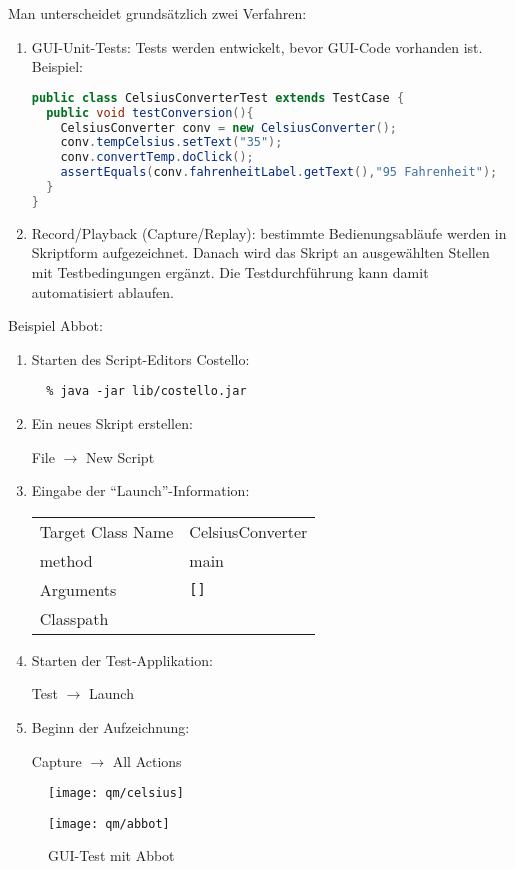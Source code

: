 \newslide
Man unterscheidet grundsätzlich zwei Verfahren:
\begin{enumerate}
\item GUI-Unit-Tests: Tests werden entwickelt, bevor GUI-Code
  vorhanden ist. Beispiel:
\begin{lstlisting}[language=java]
public class CelsiusConverterTest extends TestCase {
  public void testConversion(){
    CelsiusConverter conv = new CelsiusConverter();
    conv.tempCelsius.setText("35");
    conv.convertTemp.doClick();
    assertEquals(conv.fahrenheitLabel.getText(),"95 Fahrenheit");
  }
}
\end{lstlisting}
\newslide
\item Record/Playback (Capture/Replay): bestimmte Bedienungsabläufe werden
in Skriptform aufgezeichnet. Danach wird das Skript
an ausgewählten Stellen mit Testbedingungen ergänzt. Die
Testdurchführung kann damit automatisiert ablaufen.
\end{enumerate}
\begin{minipage}{0.48\linewidth}
\ifslides
\else
Beispiel Abbot:
\fi
\begin{enumerate}
\item Starten des Script-Editors Costello:
\begin{lstlisting}
  % java -jar lib/costello.jar
\end{lstlisting}
\item Ein neues Skript erstellen:

  File $\longrightarrow$ New Script
\item Eingabe der ``Launch''-Information:

\begin{tabular}{ll}
  Target Class Name & CelsiusConverter\\
  method & main \\
  Arguments & \verb+[]+\\
 Classpath & \\
\end{tabular}
\item Starten der Test-Applikation:

   Test $\longrightarrow$ Launch
\item Beginn der Aufzeichnung:

  Capture $\longrightarrow$ All Actions
\setcounter{saveenum}{\value{enumi}}
\end{enumerate}
\end{minipage}
\begin{minipage}{0.5\linewidth}
\begin{figure}[H]
\begin{center}
\texttt{[image: qm/celsius]}
\end{center}
\vspace{1cm}

\hfill\texttt{[image: qm/abbot]}\\
\caption{GUI-Test mit Abbot}
\end{figure}
\end{minipage}

